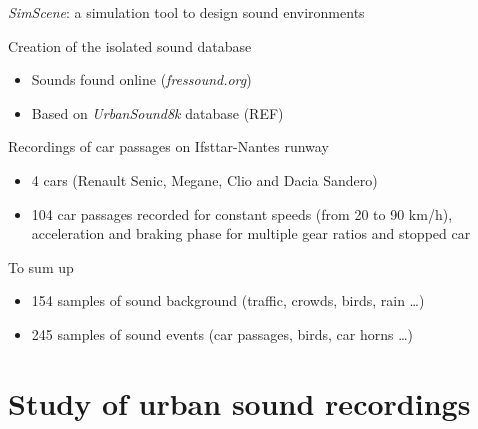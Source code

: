 \documentclass{beamer}
\begin{document}
\begin{frame}{\textit{SimScene}: a simulation tool to design sound environments}

\begin{block}{Creation of the isolated sound database}
\begin{itemize}
	\item Sounds found online (\textit{fressound.org})
	\item Based on \textit{UrbanSound8k} database (REF)
\end{itemize}
\end{block}

\begin{block}{Recordings of car passages on Ifsttar-Nantes runway}
\begin{itemize}
	\item 4 cars (Renault Senic, Megane, Clio and Dacia Sandero)
	\item 104 car passages recorded for constant speeds (from 20 to 90 km/h), acceleration and braking phase for multiple gear ratios and stopped car 
\end{itemize}		
\end{block}

\begin{block}{To sum up}
\begin{itemize}
\item 154 samples of sound background (traffic, crowds, birds, rain \dots)
\item 245 samples of sound events (car passages, birds, car horns \dots)
\end{itemize}
\end{block}

\end{frame}


\section{Study of urban sound recordings}
\end{document}
